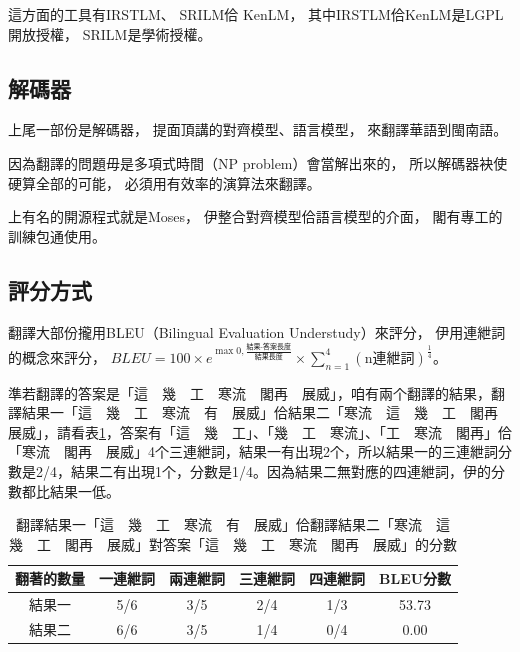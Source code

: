 這方面的工具有IRSTLM\cite{federico2008irstlm}、
SRILM\cite{stolcke2002srilm}佮
KenLM\cite{Heafield-estimate}，
其中IRSTLM佮KenLM是LGPL開放授權，
SRILM是學術授權。

\subsection{解碼器}
\label{小節：解碼器}
上尾一部份是解碼器，
提面頂講的對齊模型、語言模型，
來翻譯華語到閩南語。

因為翻譯的問題毋是多項式時間（NP problem）會當解出來的，
所以解碼器袂使硬算全部的可能，
必須用有效率的演算法來翻譯。

上有名的開源程式就是Moses\cite{Koehn:2007:MOS:1557769.1557821}，
伊整合對齊模型佮語言模型的介面，
閣有專工的訓練包通使用\cite{Moses訓練包}。

\subsection{評分方式}
\label{小節：評分方式}

翻譯大部份攏用BLEU（Bilingual Evaluation Understudy）來評分，
伊用連紲詞的概念來評分，
$BLEU=100\times{e^{\max{0,\frac{\textit{結果-答案長度}}{\textit{結果長度}}}}}\times{\sum_{n=1}^{4}(\textrm{n連紲詞})^{\frac{1}{4}}}$\cite{BLEU程式}。

準若翻譯的答案是「這　幾　工　寒流　閣再　展威」，咱有兩个翻譯的結果，翻譯結果一「這　幾　工　寒流　有　展威」佮結果二「寒流　這　幾　工　閣再　展威」，請看表\ref{表：範例BLEU分數}，答案有「這　幾　工」、「幾　工　寒流」、「工　寒流　閣再」佮「寒流　閣再　展威」4个三連紲詞，結果一有出現2个，所以結果一的三連紲詞分數是2/4，結果二有出現1个，分數是1/4。因為結果二無對應的四連紲詞，伊的分數都比結果一低。

\begin{table}
\caption{翻譯結果一「這　幾　工　寒流　有　展威」佮翻譯結果二「寒流　這　幾　工　閣再　展威」對答案「這　幾　工　寒流　閣再　展威」的分數}%
\label{表：範例BLEU分數}
\centering
\begin{tabular}{|c|cccc|c|}
\hline
翻著的數量 & 一連紲詞 & 兩連紲詞 & 三連紲詞 & 四連紲詞 & BLEU分數\\
\hline
結果一 & 5/6 & 3/5 & 2/4 & 1/3 & 53.73\\
\hline
結果二 & 6/6 & 3/5 & 1/4 & 0/4 & 0.00\\
\hline
\end{tabular}
\end{table}

